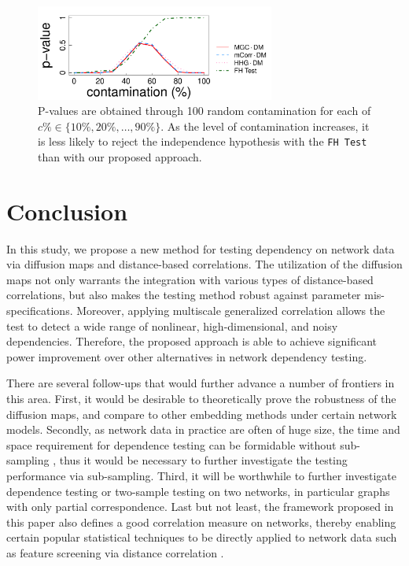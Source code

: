 \documentclass[11pt]{article}
\theoremstyle{definition}
\begin{document}
\begin{figure}[ht]
	\centering
	\includegraphics[width=0.7\textwidth]{../Figure/Elbow3_t3.pdf}
	\caption{P-values are obtained through 100 random contamination for each of $c\% \in \{ 10\%, 20\%, \ldots, 90\% \}$. As the level of contamination increases, it is less likely to reject the independence hypothesis with the \texttt{FH Test} than with our proposed approach.}
\label{fig:realexample}
\end{figure}

\section{Conclusion}
	\label{sec:conc}
	
In this study, we propose a new method for testing dependency on network data via diffusion maps and distance-based correlations. The utilization of the diffusion maps not only warrants the integration with various types of distance-based correlations, but also makes the testing method robust against parameter mis-specifications. Moreover, applying multiscale generalized correlation allows the test to detect a wide range of nonlinear, high-dimensional, and noisy dependencies. Therefore, the proposed approach is able to achieve significant power improvement over other alternatives in network dependency testing. 
    
There are several follow-ups that would further advance a number of frontiers in this area. First, it would be desirable to theoretically prove the robustness of the diffusion maps, and compare to other embedding methods under certain network models. Secondly, as network data in practice are often of huge size, the time and space requirement for dependence testing can be formidable without sub-sampling \cite{zhang2017large}, thus it would be necessary to further investigate the testing performance via sub-sampling. Third, it will be worthwhile to further investigate dependence testing or two-sample testing on two networks, in particular graphs with only partial correspondence. Last but not least, the framework proposed in this paper also defines a good correlation measure on networks, thereby enabling certain popular statistical techniques to be directly applied to network data such as feature screening via distance correlation \cite{LiZhongZhu2012}.
\end{document}
